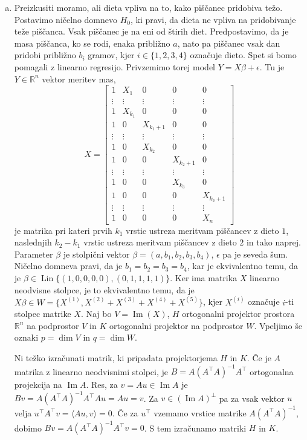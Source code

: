 \documentclass[a4paper,12pt]{article}
\def\R{\mathbb{R}}
\theoremstyle{definition}
\theoremstyle{plain}
\newcommand{\inner}[2]{\langle{#1},{#2}\rangle}
\DeclareMathOperator*{\Lin}{Lin}
\DeclareMathOperator*{\im}{Im}
\begin{document}
\begin{enumerate}[a)]
    \item Preizkusiti moramo, ali dieta vpliva na to, kako piščanec pridobiva težo. Postavimo ničelno domnevo $H_0$, ki pravi, da dieta ne vpliva na pridobivanje teže piščanca. Vsak piščanec je na eni od štirih diet. Predpostavimo, da je masa piščanca, ko se rodi, enaka približno $a$, nato pa piščanec vsak dan pridobi približno $b_i$ gramov, kjer $i \in \{1, 2, 3, 4\}$ označuje dieto. Spet si bomo pomagali z linearno regresijo. Privzemimo torej model $Y = X\beta + \epsilon$. Tu je $Y \in \R^n$ vektor meritev mas, 
    $$
    X = \left[
        \begin{array}{ccccc}
            1 & X_1 & 0 & 0 & 0 \\
            \vdots & \vdots & \vdots & \vdots & \vdots \\
            1 & X_{k_1} & 0 & 0 & 0 \\
            1 & 0 & X_{k_1 + 1} & 0 & 0 \\
            \vdots & \vdots & \vdots & \vdots & \vdots \\
            1 & 0 & X_{k_2} & 0 & 0 \\
            1 & 0 & 0 & X_{k_2 + 1} & 0 \\
            \vdots & \vdots & \vdots & \vdots & \vdots \\
            1 & 0 & 0 & X_{k_3} & 0 \\
            1 & 0 & 0 & 0 & X_{k_3 + 1} \\
            \vdots & \vdots & \vdots & \vdots & \vdots \\
            1 & 0 & 0 & 0 & X_{n}
        \end{array}
    \right]
    $$ 
    je matrika pri kateri prvih $k_1$ vrstic ustreza meritvam piščancev z dieto $1$, naslednjih $k_2 - k_1$ vrstic ustreza meritvam piščancev z dieto $2$ in tako naprej. Parameter $\beta$ je stolpični vektor $\beta = (a, b_1, b_2, b_3, b_4)$, $\epsilon$ pa je seveda šum. Ničelno domneva pravi, da je $b_1 = b_2 = b_3 = b_4$, kar je ekvivalentno temu, da je $\beta \in \Lin\{(1, 0, 0, 0, 0), (0, 1, 1, 1, 1)\}$. Ker ima matrika $X$ linearno neodvisne stolpce, je to ekvivalentno temu, da je $X\beta \in W = \{X^{(1)}, X^{(2)} + X^{(3)} + X^{(4)} + X^{(5)}\}$, kjer $X^{(i)}$ označuje $i$-ti stolpec matrike $X$. Naj bo $V = \im(X)$, $H$ ortogonalni projektor prostora $\R^n$ na podprostor $V$ in $K$ ortogonalni projektor na podprostor $W$. Vpeljimo še oznaki $p = \dim{V}$ in $q = \dim{W}$.

    Ni težko izračunati matrik, ki pripadata projektorjema $H$ in $K$. Če je $A$ matrika z linearno neodvisnimi stolpci, je $B = A (A^\top A)^{-1} A^\top$ ortogonalna projekcija na $\im{A}$. Res, za $v = Au \in \im{A}$ je $Bv = A (A^\top A)^{-1} A^\top Au = Au = v$. Za $v \in (\im{A})^\bot$ pa za vsak vektor $u$ velja $u^\top A^\top v = \inner{Au}{v} = 0$. Če za $u^\top$ vzemamo vrstice matrike $A (A^\top A)^{-1}$, dobimo $Bv = A (A^\top A)^{-1} A^\top v = 0$. S tem izračunamo matriki $H$ in $K$.


\end{enumerate}
\end{document}
